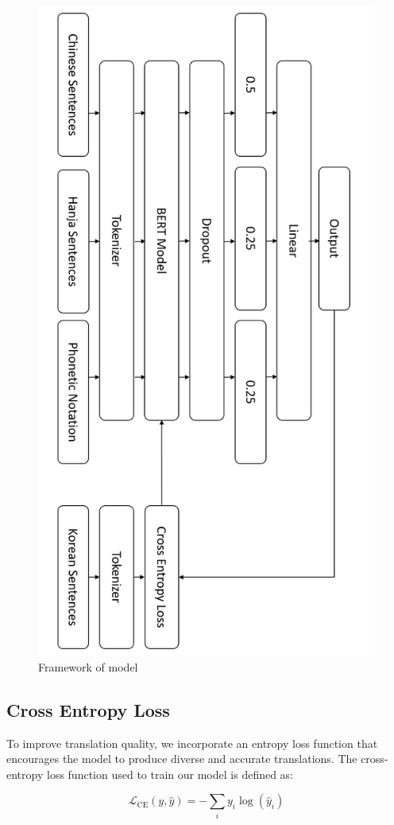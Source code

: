 \documentclass[PhD]{PHlab-thesis}
\begin{document}
\begin{figure}[h!]
  \centering
  \includegraphics[width=0.75\linewidth]{fig_3_framework.jpg}
  \captionsetup{type=figure}
  \caption{Framework of model}
  \label{fig:framwork}
\end{figure}

\subsection{Cross Entropy Loss}
To improve translation quality, we incorporate an entropy loss function \cite{zhang2018generalized}that encourages the model to produce diverse and accurate translations. The cross-entropy loss function used to train our model is defined as:

\[
\mathcal{L}_{\text{CE}}(y, \hat{y}) = -\sum_{i} y_i \log(\hat{y}_i)
\]
\end{document}
